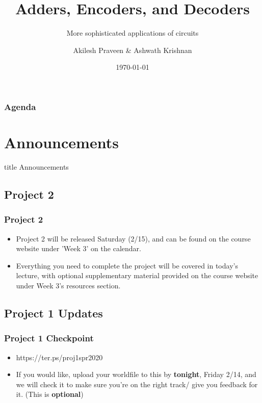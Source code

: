 \documentclass{beamer}
\title{Adders, Encoders, and Decoders}
\subtitle{More sophisticated applications of circuits}
\author[A Praveen \& A Krishnan]{Akilesh Praveen \& Ashwath Krishnan}
\institute{UMD}
\date{\today}
\begin{document}
    \begin{frame}
        \titlepage
    \end{frame}
    
    \begin{frame}
        \frametitle{Agenda}
        \tableofcontents
    \end{frame}
    
    \section{Announcements}
    
        \begin{frame}
                \vfill
                \centering
                \begin{beamercolorbox}[sep=8pt,center,shadow=true,rounded=true]{title}
                    Announcements\par%
                \end{beamercolorbox}
                \vfill
             \end{frame}
    
        \subsection{Project 2}
        
            
            
            \begin{frame}
                \frametitle{Project 2}
                \begin{itemize}
                    \item Project 2 will be released Saturday (2/15), and can be found on the course website under 'Week 3' on the calendar.
                    \item Everything you need to complete the project will be covered in today's lecture, with optional supplementary material provided on the course website under Week 3's resources section.
                \end{itemize}
            \end{frame}
            
       \subsection{Project 1 Updates}
            
            \begin{frame}
                \frametitle{Project 1 Checkpoint}
                \begin{itemize}
                    \item https://ter.ps/proj1spr2020
                    \item If you would like, upload your worldfile to this by \textbf{tonight}, Friday 2/14, and we will check it to make sure you're on the right track/ give you feedback for it. (This is \textbf{optional})
                    
                \end{itemize}
            \end{frame}
            
\end{document}
